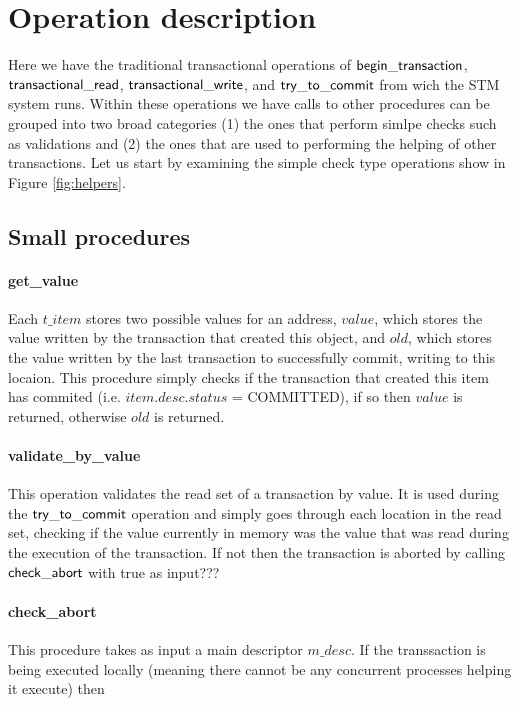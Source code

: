 \documentclass[runningheads,a4paper]{llncs}
\begin{document}
\section{Operation description}
Here we have the traditional transactional operations of ${\sf begin\_transaction}$, ${\sf transactional\_read}$, ${\sf transactional\_write}$,
and ${\sf try\_to\_commit}$ from wich the STM system runs.
Within these operations we have calls to other procedures can be grouped into two broad categories (1) the ones that perform simlpe checks such
as validations and (2) the ones that are used to performing the helping of other transactions.
Let us start by examining the simple check type operations show in Figure \ref{fig:helpers}.

\subsection{Small procedures}

\paragraph{get\_value}
Each $t\_item$ stores two possible values for an address,
$\mathit{value}$, which stores the value written by the transaction that created this object,
and $\mathit{old}$, which stores the value written by the last transaction to successfully commit, writing to this locaion.
This procedure simply checks if the transaction that created this item has commited (i.e. $\mathit{item.desc.status}$ = COMMITTED), if
so then $\mathit{value}$ is returned, otherwise $\mathit{old}$ is returned.

\paragraph{validate\_by\_value}
This operation validates the read set of a transaction by value.
It is used during the ${\sf try\_to\_commit}$ operation and simply goes through each location
in the read set, checking if the value currently in memory was the value that was read during the execution of the transaction.
If not then the transaction is aborted by calling ${\sf check\_abort}$ with true as input???

\paragraph{check\_abort}
This procedure takes as input a main descriptor $\mathit{m\_desc}$.
If the transsaction is being executed locally (meaning there cannot be any concurrent processes helping it execute)
then 
\end{document}
